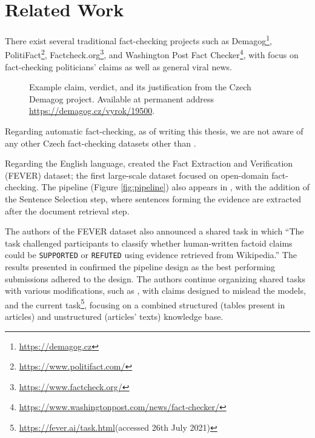 \section{Related Work}

There exist several traditional fact-checking projects such as Demagog\footnote{\url{https://demagog.cz}}, PolitiFact\footnote{\url{https://www.politifact.com/}}, Factcheck.org\footnote{\url{https://www.factcheck.org/}}, and Washington Post Fact Checker\footnote{\url{https://www.washingtonpost.com/news/fact-checker/}}, with focus on fact-checking politicians' claims as well as general viral news. 

\begin{figure}[h!]
    \caption[Czech Demagog Entry Example]{Example claim, verdict, and its justification from the Czech Demagog project. Available at permanent address \url{https://demagog.cz/vyrok/19500}.}
\end{figure}

Regarding automatic fact-checking, as of writing this thesis, we are not aware of any other Czech fact-checking datasets other than \citep{czech-fact}.

Regarding the English language, \citet{fever} created the Fact Extraction and Verification (FEVER) dataset; the first large-scale dataset focused on open-domain fact-checking.
The pipeline (Figure \ref{fig:pipeline}) also appears in \citep{fever}, with the addition of the Sentence Selection step, where sentences forming the evidence are extracted after the document retrieval step.

The authors of the FEVER dataset also announced a shared task \citep{fever-2018-shared-task} in which ``The task challenged participants to classify whether human-written factoid claims could be \texttt{SUPPORTED} or \texttt{REFUTED} using evidence retrieved from Wikipedia.'' The results presented in \citep{fever-2018-shared-task} confirmed the pipeline design as the best performing submissions adhered to the design. The authors continue organizing shared tasks with various modifications, such as \citep{fever-2019-shared-task-adversial}, with claims designed to mislead the models, and the current task\footnote{\url{https://fever.ai/task.html}(accessed 26th July 2021)}, focusing on a combined structured (tables present in articles) and unstructured (articles' texts) knowledge base.



